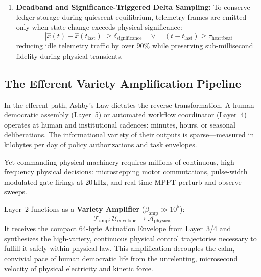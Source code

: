 \begin{enumerate}
    \item \textbf{Deadband and Significance-Triggered Delta Sampling:} To conserve ledger storage during quiescent equilibrium, telemetry frames are emitted only when state change exceeds physical significance:
    \begin{equation}
    |\hat{x}(t) - \hat{x}(t_{\mathrm{last}})| \ge \delta_{\mathrm{significance}} \quad \lor \quad (t - t_{\mathrm{last}}) \ge \tau_{\mathrm{heartbeat}}
    \label{eq:l2_deadband_delta}
    \end{equation}
    reducing idle telemetry traffic by over $90\%$ while preserving sub-millisecond fidelity during physical transients.
\end{enumerate}

\subsection{The Efferent Variety Amplification Pipeline}

In the efferent path, Ashby's Law dictates the reverse transformation. A human democratic assembly (Layer~5) or automated workflow coordinator (Layer~4) operates at human and institutional cadences: minutes, hours, or seasonal deliberations. The informational variety of their outputs is sparse---measured in kilobytes per day of policy authorizations and task envelopes.

Yet commanding physical machinery requires millions of continuous, high-frequency physical decisions: microstepping motor commutations, pulse-width modulated gate firings at $20\,\mathrm{kHz}$, and real-time MPPT perturb-and-observe sweeps.

Layer~2 functions as a \textbf{Variety Amplifier} ($\beta_{\mathrm{amp}} \gg 10^5$):
\begin{equation}
\mathcal{T}_{\mathrm{amp}}: \mathcal{U}_{\mathrm{envelope}} \longrightarrow \mathcal{A}_{\mathrm{physical}}
\label{eq:l2_variety_amplifier}
\end{equation}
It receives the compact 64-byte Actuation Envelope from Layer~3/4 and synthesizes the high-variety, continuous physical control trajectories necessary to fulfill it safely within physical law. This amplification decouples the calm, convivial pace of human democratic life from the unrelenting, microsecond velocity of physical electricity and kinetic force.

